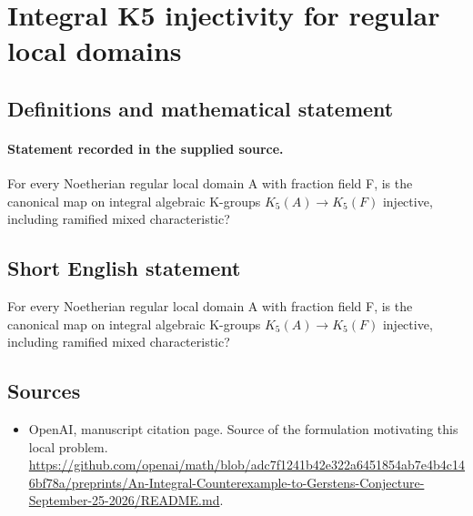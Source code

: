 \documentclass[11pt]{article}
\begin{document}
\section*{Integral K5 injectivity for regular local domains}\label{30006999}
\subsection{Definitions and mathematical statement}
\paragraph{Statement recorded in the supplied source.}
For every Noetherian regular local domain A with fraction field F, is the canonical map on integral algebraic K-groups $K_{5}(A)\to K_{5}(F)$ injective, including ramified mixed characteristic?
\subsection{Short English statement}
For every Noetherian regular local domain A with fraction field F, is the canonical map on integral algebraic K-groups $K_{5}(A)\to K_{5}(F)$ injective, including ramified mixed characteristic?
\subsection{Sources}
\begin{itemize}
\item[S1] OpenAI, manuscript citation page. Source of the formulation motivating this local problem.
\url{https://github.com/openai/math/blob/adc7f1241b42e322a6451854ab7e4b4c146bf78a/preprints/An-Integral-Counterexample-to-Gerstens-Conjecture-September-25-2026/README.md}.
\end{itemize}
\end{document}
